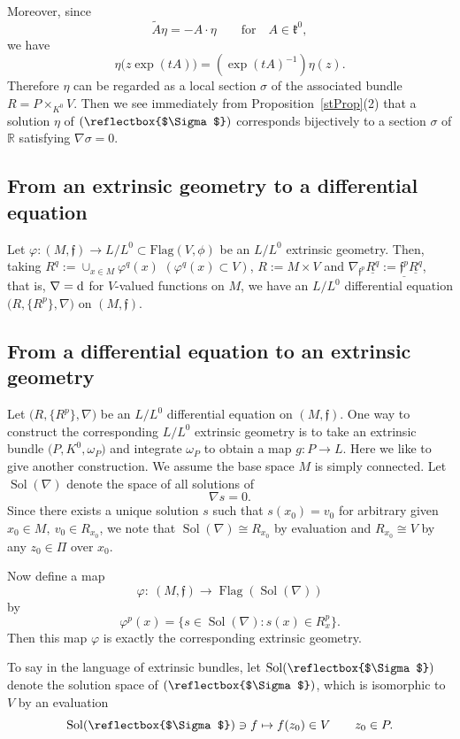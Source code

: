 \documentclass[10pt,a4paper]{amsart}
\newcommand{\R}{\mathbb R}
\newcommand{\f}{\mathfrak f}
\newcommand{\kf}{\mathfrak k}
\newcommand{\Flag}{\operatorname{Flag}}
\newcommand{\Sol}{\operatorname{Sol}}
\DeclareRobustCommand{\amgiS}{\text{\reflectbox{$\Sigma$}}}
\numberwithin{equation}{section}
\begin{document}
Moreover, since
\[
\tilde A \eta = -A\cdot \eta\qquad\text{for}\quad A\in \kf^0,
\]
we have
\[
\eta\big(z\exp(tA)\big) = \left(\exp(tA)^{-1}\right)\eta(z).
\]
Therefore $\eta$ can be regarded as a local section $\sigma$ of the associated bundle $R=P\times_{K^0} V$. Then we see immediately from Proposition~\ref{stProp}(2) that a solution $\eta$ of $(\amgiS)$ corresponds bijectively to a section $\sigma$ of $\R$ satisfying $\nabla\sigma = 0$.


\subsection{From an extrinsic geometry to a differential equation}

Let $\varphi\colon (M,\f) \to L/L^0 \subset \mathrm{Flag}(V,\phi)$
be an $L/L^0$ extrinsic geometry.
Then, taking $R^q:=\cup_{x\in M}\varphi^q(x)$ $(\varphi^q(x)\subset V)$,
$R:=M\times V$
and $\nabla_{\f^p}\underline{R^q}:=\underline{\f^p} \underline{R^q}$, that is, $\nabla={\rm d}$ for $V$-valued functions on $M$, we have an $L/L^0$ differential equation $\big(R,\{ R^p\},\nabla\big)$ on $(M,\f)$.


\subsection{From a differential equation to an extrinsic geometry}

Let $\big(R, \{R^p\}, \nabla\big)$ be an $L/L^0$ differential equation on $(M, \f )$. One way to construct the corresponding
$L/L^0$ extrinsic geometry is to take an extrinsic bundle $\big(P, K^0, \omega_P\big)$ and integrate
$\omega_P $ to obtain a map $g\colon P \to L$.
Here we like to give another construction.
We assume the base space $M$ is simply connected.
Let $\Sol(\nabla)$ denote the space of all solutions of
\[
	\nabla s = 0 .
\]
Since there exists a unique solution $s$ such that $s(x_0) = v_0$ for arbitrary given $x_0 \in M, \ v_0 \in R_{x_0}$,
we note that $\Sol(\nabla ) \cong R_{x_0}$ by evaluation and
$R_{x_0} \cong V$ by any $z_0 \in \Pi$ over $x_0$.

Now define a map
\[
\varphi\colon\ (M, \f) \to \Flag(\Sol(\nabla))
\]
by
\[
	\varphi^p(x) = \big\{ s \in \Sol(\nabla) \colon s(x) \in R^p_x \big\}.
\]
Then this map $\varphi$ is exactly the corresponding extrinsic geometry.

To say in the language of extrinsic bundles, let $\Sol(\amgiS)$ denote the solution space of $(\amgiS)$, which is isomorphic to $V$ by an evaluation
\[
\Sol(\amgiS) \ni f \mapsto f(z_0) \in V \qquad z_0 \in P.
\]
\end{document}
